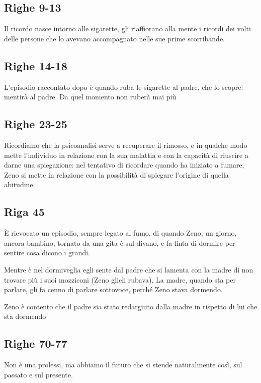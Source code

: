 \subsection{Righe 9-13}

Il ricordo nasce intorno alle sigarette, gli riaffiorano alla mente i ricordi dei volti delle persone che lo avevano accompagnato nelle sue prime scorribande.

\subsection{Righe 14-18}

L'episodio raccontato dopo è quando ruba le sigarette al padre, che lo scopre: mentirà al padre. Da quel momento non ruberà mai più

\subsection{Righe 23-25}

Ricordiamo che la psicoanalisi serve a recuperare il rimosso, e in qualche modo mette l'individuo in relazione con la sua malattia e con la capacità di riuscire a darne una spiegazione: nel tentativo di ricordare quando ha iniziato a fumare, Zeno si mette in relazione con la possibilità di spiegare l'origine di quella abitudine.

\subsection{Riga 45}

È rievocato un episodio, sempre legato al fumo, di quando Zeno, un giorno, ancora bambino, tornato da una gita è sul divano, e fa finta di dormire per sentire cosa dicono i grandi.

Mentre è nel dormiveglia egli sente dal padre che si lamenta con la madre di non trovare più i suoi mozziconi (Zeno glieli rubava). La madre, quando sta per parlare, gli fa cenno di parlare sottovoce, perché Zeno stava dormendo.

Zeno è contento che il padre sia stato redarguito dalla madre in rispetto di lui che sta dormendo

\subsection{Righe 70-77}

Non è una prolessi, ma abbiamo il futuro che si stende naturalmente così, sul passato e sul presente.


